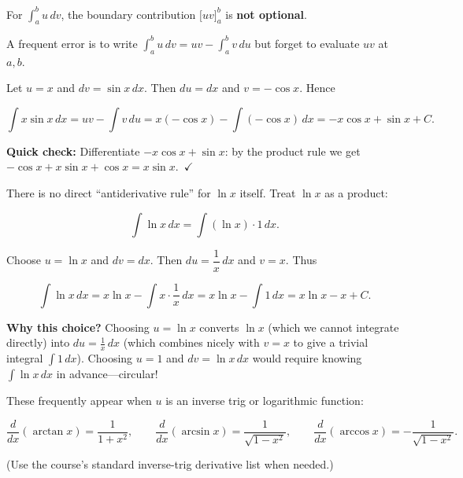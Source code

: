 \begin{commonmistake}[title={Common Mistake: Forgetting the boundary term in definite IBP}]

For $\int_a^b u\,dv$, the boundary contribution $\big[uv\big]_a^b$ is \textbf{not optional}.

A frequent error is to write $\int_a^b u\,dv = uv - \int_a^b v\,du$ but forget to evaluate $uv$ at $a,b$.

\end{commonmistake}

\begin{examplebox}[title={Worked Example: $\displaystyle \int x\sin x\,dx$}]

Let $u=x$ and $dv=\sin x\,dx$. Then $du=dx$ and $v=-\cos x$. Hence

\[
\int x\sin x\,dx = uv-\int v\,du
= x(-\cos x) - \int (-\cos x)\,dx
= -x\cos x + \sin x + C.
\]

\textbf{Quick check:} Differentiate $-x\cos x+\sin x$: by the product rule we get $-\cos x+x\sin x+\cos x = x\sin x$.\ $\checkmark$

\end{examplebox}

\begin{examplebox}[title={Worked Example: $\displaystyle \int \ln x\,dx$ (why IBP is necessary)}]

There is no direct ``antiderivative rule'' for $\ln x$ itself. Treat $\ln x$ as a product:

\[
\int \ln x\,dx = \int (\ln x)\cdot 1\,dx.
\]

Choose $u=\ln x$ and $dv=dx$. Then $du=\dfrac{1}{x}\,dx$ and $v=x$. Thus

\[
\int \ln x\,dx = x\ln x - \int x\cdot \frac{1}{x}\,dx
= x\ln x - \int 1\,dx
= x\ln x - x + C.
\]

\textbf{Why this choice?} Choosing $u=\ln x$ converts $\ln x$ (which we cannot integrate directly) into $du=\frac{1}{x}\,dx$ (which combines nicely with $v=x$ to give a trivial integral $\int 1\,dx$). Choosing $u=1$ and $dv=\ln x\,dx$ would require knowing $\int \ln x\,dx$ in advance---circular!

\end{examplebox}

\begin{keyformula}[title={Key Formula: Derivatives often paired with IBP}]

These frequently appear when $u$ is an inverse trig or logarithmic function:

\[
\frac{d}{dx}(\arctan x)=\frac{1}{1+x^2},\qquad
\frac{d}{dx}(\arcsin x)=\frac{1}{\sqrt{1-x^2}},\qquad
\frac{d}{dx}(\arccos x)=-\frac{1}{\sqrt{1-x^2}}.
\]

(Use the course's standard inverse-trig derivative list when needed.)

\end{keyformula}

